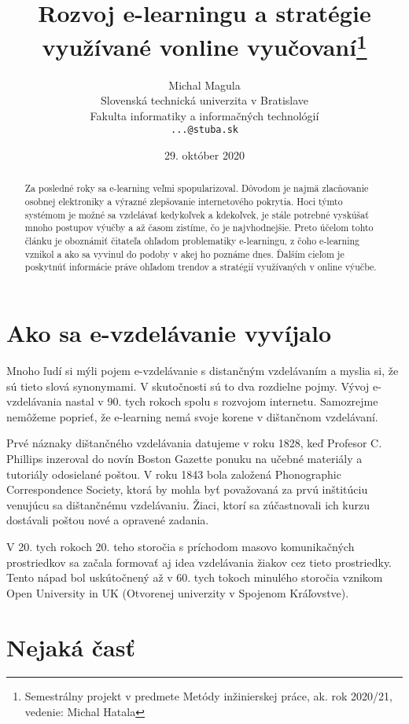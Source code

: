 \documentclass[10pt,twoside,slovak,a4paper]{article}
\title{Rozvoj e-learningu a stratégie využívané vonline vyučovaní\thanks{Semestrálny projekt v predmete Metódy inžinierskej práce, ak. rok 2020/21, vedenie: Michal Hatala}} %
\author{Michal Magula\\[2pt]
	{\small Slovenská technická univerzita v Bratislave}\\
	{\small Fakulta informatiky a informačných technológií}\\
	{\small \texttt{...@stuba.sk}}
	}
\date{\small 29. október 2020} %
\begin{document}
\maketitle

\begin{abstract}
	Za posledné roky sa e-learning veľmi spopularizoval. Dôvodom je najmä zlacňovanie osobnej elektroniky
	a výrazné zlepšovanie internetového pokrytia. Hoci týmto systémom je možné sa vzdelávať kedykoľvek
	a kdekoľvek, je stále potrebné vyskúšať mnoho postupov výučby a až časom zistíme, čo je najvhodnejšie.
	Preto účelom tohto článku je oboznámiť čitateľa ohľadom problematiky e-learningu, z čoho e-learning
	vznikol a ako sa vyvinul do podoby v akej ho poznáme dnes. Ďalším cieľom je poskytnúť informácie práve
	ohľadom trendov a stratégií využívaných v online výučbe.
\end{abstract}



\section{Ako sa e-vzdelávanie vyvíjalo}

	Mnoho ľudí si mýli pojem e-vzdelávanie s distančným vzdelávaním a myslia si, že sú tieto slová synonymami.
	V skutočnosti sú to dva rozdielne pojmy. Vývoj e-vzdelávania nastal v 90. tych rokoch spolu s rozvojom internetu.
	Samozrejme nemôžeme poprieť, že e-learning nemá svoje korene v dištančnom vzdelávaní.

	Prvé náznaky dištančného vzdelávania datujeme v roku 1828, keď Profesor C. Phillips inzeroval do novín
	Boston Gazette ponuku na učebné materiály a tutoriály odosielané poštou. V roku 1843 bola 
	založená Phonographic Correspondence Society, ktorá by mohla byť považovaná za prvú inštitúciu 
	venujúcu sa dištančnému vzdelávaniu. Žiaci, ktorí sa zúčastnovali ich kurzu dostávali poštou
	nové a opravené zadania.

	V 20. tych rokoch 20. teho storočia s príchodom masovo komunikačných prostriedkov sa začala formovať aj idea
	vzdelávania žiakov cez tieto prostriedky. Tento nápad bol uskútočnený až v 60. tych tokoch minulého storočia 
	vznikom Open University in UK (Otvorenej univerzity v Spojenom Kráľovstve).



\section{Nejaká časť} \label{nejaka}
\end{document}
